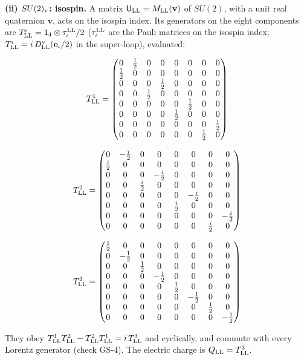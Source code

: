 \documentclass[
  10pt,
]{article}
\begin{document}
\textbf{(ii) \(SU(2)_{\rm v}\): isospin.} A matrix
\(\mathsf U_{\rm LL}=M_{\rm LL}(\mathbf v)\) of \(SU(2)\), with a unit
real quaternion \(\mathbf v\), acts on the isospin index. Its generators
on the eight components are
\(T^\iota_{\rm LL}=\mathsf 1_4\otimes\tau^{\rm LL}_\iota/2\)
(\(\tau^{\rm LL}_\iota\) are the Pauli matrices on the isospin index;
\(T^\iota_{\rm LL}=i\,D^{\rm v}_{\rm LL}(\mathbf e_\iota/2)\) in the
super-loop), evaluated:

\[T^1_{\rm LL}=\begin{pmatrix}0&\tfrac{1}{2}&0&0&0&0&0&0\\\tfrac{1}{2}&0&0&0&0&0&0&0\\0&0&0&\tfrac{1}{2}&0&0&0&0\\0&0&\tfrac{1}{2}&0&0&0&0&0\\0&0&0&0&0&\tfrac{1}{2}&0&0\\0&0&0&0&\tfrac{1}{2}&0&0&0\\0&0&0&0&0&0&0&\tfrac{1}{2}\\0&0&0&0&0&0&\tfrac{1}{2}&0\end{pmatrix}\]

\[T^2_{\rm LL}=\begin{pmatrix}0&-\tfrac{i}{2}&0&0&0&0&0&0\\\tfrac{i}{2}&0&0&0&0&0&0&0\\0&0&0&-\tfrac{i}{2}&0&0&0&0\\0&0&\tfrac{i}{2}&0&0&0&0&0\\0&0&0&0&0&-\tfrac{i}{2}&0&0\\0&0&0&0&\tfrac{i}{2}&0&0&0\\0&0&0&0&0&0&0&-\tfrac{i}{2}\\0&0&0&0&0&0&\tfrac{i}{2}&0\end{pmatrix}\]

\[T^3_{\rm LL}=\begin{pmatrix}\tfrac{1}{2}&0&0&0&0&0&0&0\\0&-\tfrac{1}{2}&0&0&0&0&0&0\\0&0&\tfrac{1}{2}&0&0&0&0&0\\0&0&0&-\tfrac{1}{2}&0&0&0&0\\0&0&0&0&\tfrac{1}{2}&0&0&0\\0&0&0&0&0&-\tfrac{1}{2}&0&0\\0&0&0&0&0&0&\tfrac{1}{2}&0\\0&0&0&0&0&0&0&-\tfrac{1}{2}\end{pmatrix}\]

They obey
\(T^1_{\rm LL}T^2_{\rm LL}-T^2_{\rm LL}T^1_{\rm LL}=i\,T^3_{\rm LL}\)
and cyclically, and commute with every Lorentz generator (check GS-4).
The electric charge is \(Q_{\rm LL}=T^3_{\rm LL}\).
\end{document}
